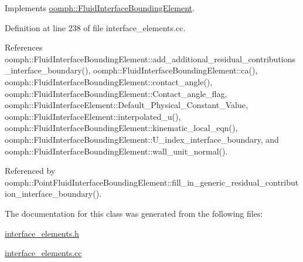Implements \hyperlink{classoomph_1_1FluidInterfaceBoundingElement_a69fa099e0cbfe8ae028a4edc77fedc60}{oomph\+::\+Fluid\+Interface\+Bounding\+Element}.



Definition at line 238 of file interface\+\_\+elements.\+cc.



References oomph\+::\+Fluid\+Interface\+Bounding\+Element\+::add\+\_\+additional\+\_\+residual\+\_\+contributions\+\_\+interface\+\_\+boundary(), oomph\+::\+Fluid\+Interface\+Bounding\+Element\+::ca(), oomph\+::\+Fluid\+Interface\+Bounding\+Element\+::contact\+\_\+angle(), oomph\+::\+Fluid\+Interface\+Bounding\+Element\+::\+Contact\+\_\+angle\+\_\+flag, oomph\+::\+Fluid\+Interface\+Element\+::\+Default\+\_\+\+Physical\+\_\+\+Constant\+\_\+\+Value, oomph\+::\+Fluid\+Interface\+Element\+::interpolated\+\_\+u(), oomph\+::\+Fluid\+Interface\+Bounding\+Element\+::kinematic\+\_\+local\+\_\+eqn(), oomph\+::\+Fluid\+Interface\+Bounding\+Element\+::\+U\+\_\+index\+\_\+interface\+\_\+boundary, and oomph\+::\+Fluid\+Interface\+Bounding\+Element\+::wall\+\_\+unit\+\_\+normal().



Referenced by oomph\+::\+Point\+Fluid\+Interface\+Bounding\+Element\+::fill\+\_\+in\+\_\+generic\+\_\+residual\+\_\+contribution\+\_\+interface\+\_\+boundary().



The documentation for this class was generated from the following files\+:\begin{DoxyCompactItemize}
\item 
\hyperlink{interface__elements_8h}{interface\+\_\+elements.\+h}\item 
\hyperlink{interface__elements_8cc}{interface\+\_\+elements.\+cc}\end{DoxyCompactItemize}
